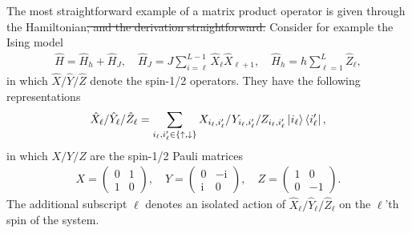 \documentclass{svmono}
\def\ri{\mathrm i}
\providecommand{\DIFaddtex}[1]{{\protect\color{blue}\uwave{#1}}} %
\providecommand{\DIFdeltex}[1]{{\protect\color{red}\sout{#1}}}                      %
\providecommand{\DIFaddbegin}{} %
\providecommand{\DIFaddend}{} %
\providecommand{\DIFdelbegin}{} %
\providecommand{\DIFdelend}{} %
\providecommand{\DIFadd}[1]{\texorpdfstring{\DIFaddtex{#1}}{#1}} %
\providecommand{\DIFdel}[1]{\texorpdfstring{\DIFdeltex{#1}}{}} %
\newcommand{\DIFscaledelfig}{0.5}
\newlength{\DIFdelgraphicswidth} %
\newlength{\DIFdelgraphicsheight} %
\newcommand{\DIFaddincludegraphics}[2][]{{\color{blue}\fbox{\DIFOincludegraphics[#1]{#2}}}} %
\newcommand{\DIFdelincludegraphics}[2][]{%
\sbox{\DIFdelgraphicsbox}{\DIFOincludegraphics[#1]{#2}}%
\settoboxwidth{\DIFdelgraphicswidth}{\DIFdelgraphicsbox} %
\settoboxtotalheight{\DIFdelgraphicsheight}{\DIFdelgraphicsbox} %
\scalebox{\DIFscaledelfig}{%
\parbox[b]{\DIFdelgraphicswidth}{\usebox{\DIFdelgraphicsbox}\\[-\baselineskip] \rule{\DIFdelgraphicswidth}{0em}}\llap{\resizebox{\DIFdelgraphicswidth}{\DIFdelgraphicsheight}{%
\setlength{\unitlength}{\DIFdelgraphicswidth}%
\begin{picture}(1,1)%
\thicklines\linethickness{2pt} %
{\color[rgb]{1,0,0}\put(0,0){\framebox(1,1){}}}%
{\color[rgb]{1,0,0}\put(0,0){\line( 1,1){1}}}%
{\color[rgb]{1,0,0}\put(0,1){\line(1,-1){1}}}%
\end{picture}%
}\hspace*{3pt}}} %
} %
\DeclareRobustCommand{\DIFaddbegin}{\DIFOaddbegin \let\includegraphics\DIFaddincludegraphics} %
\DeclareRobustCommand{\DIFaddend}{\DIFOaddend \let\includegraphics\DIFOincludegraphics} %
\DeclareRobustCommand{\DIFdelbegin}{\DIFOdelbegin \let\includegraphics\DIFdelincludegraphics} %
\DeclareRobustCommand{\DIFdelend}{\DIFOaddend \let\includegraphics\DIFOincludegraphics} %
\begin{document}
The most straightforward example of a matrix product operator \DIFaddbegin \DIFadd{(MPO) }\DIFaddend is given through the Hamiltonian\DIFdelbegin \DIFdel{, and the derivation straightforward.
}\DIFdelend \DIFaddbegin \DIFadd{:
}\DIFaddend Consider for example the Ising model
\begin{align}
    \hat H = \hat H_{h} + \hat H_{J},
    \quad
    \hat H_{J} = J\sum_{i=\ell}^{L-1}\hat X_\ell \hat X_{\ell+1},
    \quad
    \hat H_{h} = h\sum_{\ell=1}^{L}\hat Z_\ell,
\end{align}
in which $\hat X/\hat Y/\hat Z$ denote the spin-1/2 operators.
They have the following representations
\begin{align}
    \hat X_\ell/\hat Y_\ell/\hat Z_\ell = \sum_{i_\ell,i'_\ell\in\{\uparrow,\downarrow\}}X_{i_\ell,i_\ell'}/Y_{i_\ell,i_\ell'}/Z_{i_\ell,i_\ell'}\ket{i_\ell}\bra{i'_\ell},
\end{align}
in which $X/Y/Z$ are the spin-1/2 Pauli matrices
\begin{align}
    X =
    \begin{pmatrix}
        0 & 1 \\
        1 & 0
    \end{pmatrix}
    ,
    \quad
    Y =
    \begin{pmatrix}
        0 & -\ri \\
        \ri & 0
    \end{pmatrix}
    ,
    \quad
    Z =
    \begin{pmatrix}
        1 & 0 \\
        0 & -1
    \end{pmatrix}.
\end{align}
The additional subscript $\ell$ denotes an isolated action of $\hat X_\ell/\hat Y_\ell/\hat Z_\ell$ on the $\ell$'th spin of the system.
\end{document}
